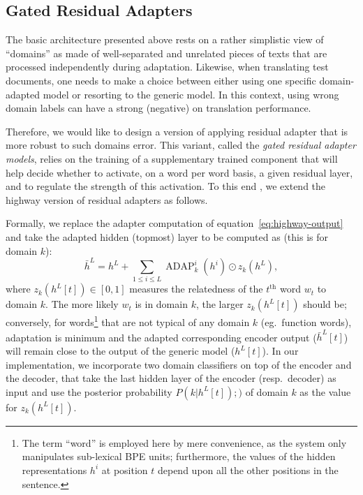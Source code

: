 \documentclass[11pt,a4paper]{article}
\newcommand{\fyDone}[1]{\done[FY]\Todo[FY:]{\textcolor{orange}{#1}}}
\newcommand{\mpDone}[1]{\done[MP]\Todo[MP:]{\textcolor{green}{#1}}}
\begin{document}
\subsection{Gated Residual Adapters \label{ssec:gate}}
\mpDone{Formalizing problem, network design, training algorithm}
The basic architecture presented above rests on a rather simplistic view of ``domains'' as made of well-separated and unrelated pieces of texts that are processed independently during adaptation. Likewise, when translating test documents, one needs to make a choice between either using one specific domain-adapted model or resorting to the generic model. In this context, using wrong domain labels can have a strong (negative) on translation performance. 

Therefore, we would like to design a version of applying residual adapter that is more robust to such domains error. This variant, called the \emph{gated residual adapter models}, relies on the training of a supplementary trained component that will help decide whether to activate, on a word per word basis, a given residual layer, and to regulate the strength of this activation. To this end , we extend the highway version of residual adapters as follows.
\fyDone{Consistency of notations wrt section 2.1}

Formally, we replace the adapter computation of equation~\eqref{eq:highway-output} and take the adapted hidden (topmost) layer to be computed as (this is for domain $k$):
\begin{equation}
  \bar{h}^L = h^L + \displaystyle{\mathop{\sum}_{1 \leq i \leq L} \operatorname{ADAP}_k^i(h^i) \odot{} z_k(h^L)}, \label{eq:gated-output}
\end{equation}
where $z_k(h^L[t]) \in [0,1]$ measures the relatedness of the $t^{\text{th}}$ word $w_t$ to domain $k$. The more likely $w_t$ is in domain $k$, the larger $z_k(h^L[t])$ should be; conversely, for words\footnote{The term ``word'' is employed here by mere convenience, as the system only manipulates sub-lexical BPE units; furthermore, the values of the hidden representations $h^{i}$ at position $t$ depend upon all the other positions in the sentence.} that are not typical of any domain $k$ (eg.\ function words),  adaptation is minimum and the adapted corresponding encoder output ($\bar{h}^L[t]$) will remain close to the output of the generic model ($h^L[t]$). In our implementation, we incorporate two domain classifiers on top of the encoder and the decoder, that take the last hidden layer of the encoder (resp.\ decoder) as input and use the posterior probability $P(k|h^L[t]);)$ of domain $k$ as the value for $z_k(h^L[t])$.
\end{document}
